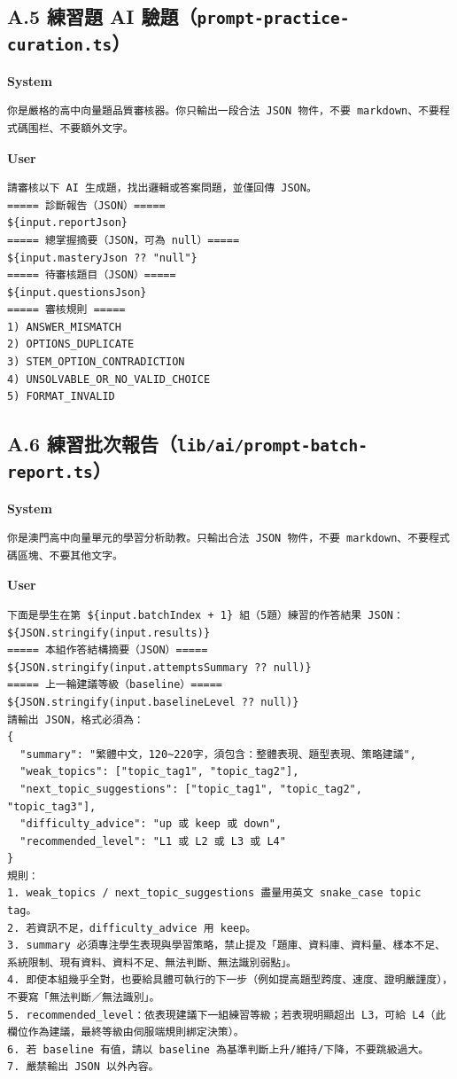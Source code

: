 \documentclass[12pt,a4paper]{article}
\begin{document}
\subsection*{A.5 練習題 AI 驗題（\texttt{prompt-practice-curation.ts}）}
\textbf{System}
\begin{verbatim}
你是嚴格的高中向量題品質審核器。你只輸出一段合法 JSON 物件，不要 markdown、不要程式碼围栏、不要額外文字。
\end{verbatim}
\textbf{User}
\begin{verbatim}
請審核以下 AI 生成題，找出邏輯或答案問題，並僅回傳 JSON。
===== 診斷報告（JSON）=====
${input.reportJson}
===== 總掌握摘要（JSON，可為 null）=====
${input.masteryJson ?? "null"}
===== 待審核題目（JSON）=====
${input.questionsJson}
===== 審核規則 =====
1) ANSWER_MISMATCH
2) OPTIONS_DUPLICATE
3) STEM_OPTION_CONTRADICTION
4) UNSOLVABLE_OR_NO_VALID_CHOICE
5) FORMAT_INVALID
\end{verbatim}

\subsection*{A.6 練習批次報告（\texttt{lib/ai/prompt-batch-report.ts}）}
\textbf{System}
\begin{verbatim}
你是澳門高中向量單元的學習分析助教。只輸出合法 JSON 物件，不要 markdown、不要程式碼區塊、不要其他文字。
\end{verbatim}
\textbf{User}
\begin{verbatim}
下面是學生在第 ${input.batchIndex + 1} 組（5題）練習的作答結果 JSON：
${JSON.stringify(input.results)}
===== 本組作答結構摘要（JSON）=====
${JSON.stringify(input.attemptsSummary ?? null)}
===== 上一輪建議等級（baseline）=====
${JSON.stringify(input.baselineLevel ?? null)}
請輸出 JSON，格式必須為：
{
  "summary": "繁體中文，120~220字，須包含：整體表現、題型表現、策略建議",
  "weak_topics": ["topic_tag1", "topic_tag2"],
  "next_topic_suggestions": ["topic_tag1", "topic_tag2", "topic_tag3"],
  "difficulty_advice": "up 或 keep 或 down",
  "recommended_level": "L1 或 L2 或 L3 或 L4"
}
規則：
1. weak_topics / next_topic_suggestions 盡量用英文 snake_case topic tag。
2. 若資訊不足，difficulty_advice 用 keep。
3. summary 必須專注學生表現與學習策略，禁止提及「題庫、資料庫、資料量、樣本不足、系統限制、現有資料、資料不足、無法判斷、無法識別弱點」。
4. 即使本組幾乎全對，也要給具體可執行的下一步（例如提高題型跨度、速度、證明嚴謹度），不要寫「無法判斷／無法識別」。
5. recommended_level：依表現建議下一組練習等級；若表現明顯超出 L3，可給 L4（此欄位作為建議，最終等級由伺服端規則綁定決策）。
6. 若 baseline 有值，請以 baseline 為基準判斷上升/維持/下降，不要跳級過大。
7. 嚴禁輸出 JSON 以外內容。
\end{verbatim}
\end{document}
